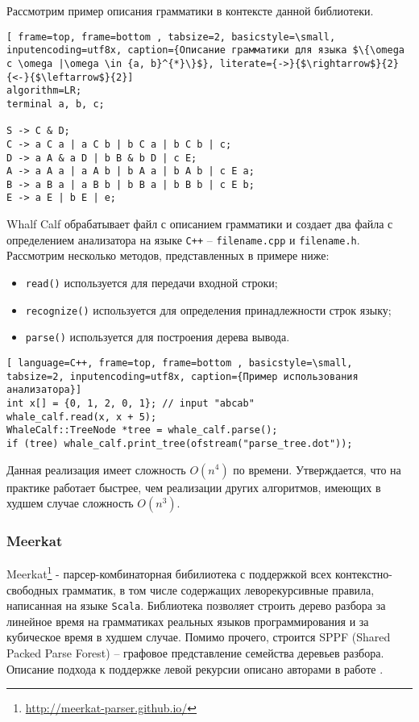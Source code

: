 \documentclass[14pt]{matmex-diploma}
\begin{document}
Рассмотрим пример описания грамматики в контексте данной библиотеки.
\begin{lstlisting}[ frame=top, frame=bottom , tabsize=2, basicstyle=\small, inputencoding=utf8x, caption={Описание грамматики для языка $\{\omega c \omega |\omega \in {a, b}^{*}\}$}, literate={->}{$\rightarrow$}{2} {<-}{$\leftarrow$}{2}]
algorithm=LR;
terminal a, b, c;

S -> C & D;
C -> a C a | a C b | b C a | b C b | c;
D -> a A & a D | b B & b D | c E;
A -> a A a | a A b | b A a | b A b | c E a;
B -> a B a | a B b | b B a | b B b | c E b;
E -> a E | b E | e;
\end{lstlisting}

Whalf Calf обрабатывает файл с описанием грамматики и создает два файла с определением анализатора на языке {\tt C++} -- {\tt filename.cpp} и {\tt filename.h}. Рассмотрим несколько методов, представленных в примере ниже:
\begin{itemize}
    \item {\tt read()} используется для передачи входной строки;
    \item {\tt recognize()} используется для определения принадлежности строк языку;
    \item {\tt parse()} используется для построения дерева вывода.
     
\end{itemize}

\begin{lstlisting}[ language=C++, frame=top, frame=bottom , basicstyle=\small, tabsize=2, inputencoding=utf8x, caption={Пример использования анализатора}]
int x[] = {0, 1, 2, 0, 1}; // input "abcab"
whale_calf.read(x, x + 5);
WhaleCalf::TreeNode *tree = whale_calf.parse();
if (tree) whale_calf.print_tree(ofstream("parse_tree.dot"));
\end{lstlisting}

Данная реализация имеет сложность $O(n^{4})$ по времени. Утверждается, что на практике работает быстрее, чем реализации других алгоритмов, имеющих в худшем случае сложность $O(n^{3})$.


\subsubsection{Meerkat}
Meerkat\footnote{\url{http://meerkat-parser.github.io/}} - парсер-комбинаторная бибилиотека с поддержкой всех контекстно-свободных грамматик, в том числе содержащих леворекурсивные правила, написанная на языке {\tt Scala}. Библиотека позволяет строить дерево разбора за линейное время на грамматиках реальных языков программирования и за кубическое время в худшем случае. Помимо прочего, строится SPPF (Shared Packed Parse Forest) -- графовое представление семейства деревьев разбора. Описание подхода к поддержке левой рекурсии описано авторами в работе \cite{izmaylova2016practical}.
\end{document}
